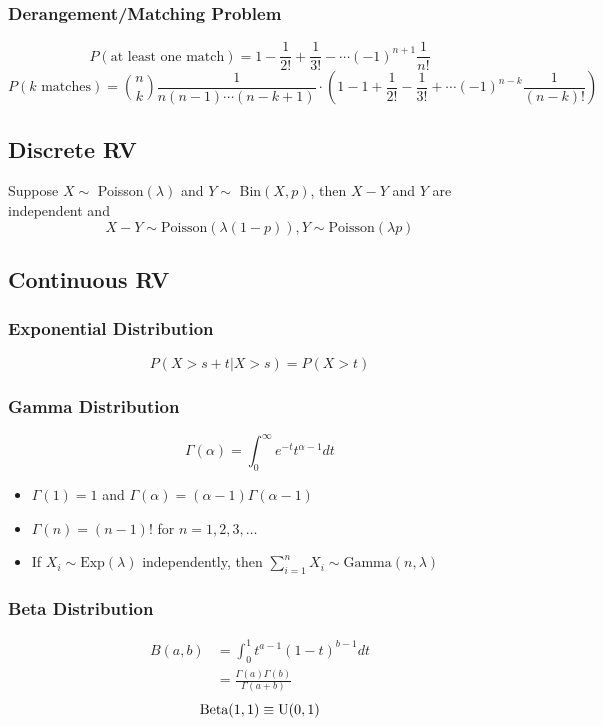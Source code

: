 \documentclass{article}
\begin{document}
\subsubsection*{Derangement/Matching Problem}
$$P(\text{at least one match}) = 1 - \frac{1}{2!}+\frac{1}{3!} -\cdots (-1)^{n+1}\frac{1}{n!}$$
$$P(k\text{ matches}) = {n \choose k} \frac{1}{n(n-1)\cdots(n-k+1)}\cdot \left({1- 1 + \frac{1}{2!}-\frac{1}{3!} +\cdots (-1)^{n-k}\frac{1}{(n-k)!}}\right)$$
\begin{multicols}{2}


\subsection{Discrete RV}
Suppose $X \sim$ Poisson$(\lambda)$ and $Y \sim$ Bin$(X,p)$, then
$X-Y$ and $Y$ are independent and 
$$X-Y \sim \text{Poisson}(\lambda(1-p)), Y \sim \text{Poisson}(\lambda p)$$

\subsection{Continuous RV}
\subsubsection*{Exponential Distribution}
\begin{equation*}
 P(X>s+t| X>s) = P(X>t)
\end{equation*}
\subsubsection*{Gamma Distribution}
\begin{equation*}
 \Gamma(\alpha) = \int_{0}^{\infty}e^{-t}t^{\alpha-1}dt
\end{equation*}
\begin{itemize}
 \item $\Gamma(1)= 1$  and $\Gamma(\alpha) = (\alpha-1)\Gamma(\alpha-1)$
 \item $\Gamma(n)=(n-1)!$ for $n = 1,2,3,\dots$
 \item If $X_i \sim \text{Exp}(\lambda)$ independently, then $\sum_{i=1}^n X_i \sim \text{Gamma}(n,\lambda)$
 
\end{itemize}

\subsubsection*{Beta Distribution}
\begin{equation*}
\begin{split}
 B(a,b) &= \int_{0}^{1}t^{a-1}(1-t)^{b-1}dt\\
 &= \frac{\Gamma(a)\Gamma(b)}{\Gamma(a+b)}
\end{split}
\end{equation*}
\begin{equation*}
 \text{Beta}(1,1) \equiv \text{U}(0,1)\\
\end{equation*}


\end{multicols}
\end{document}
